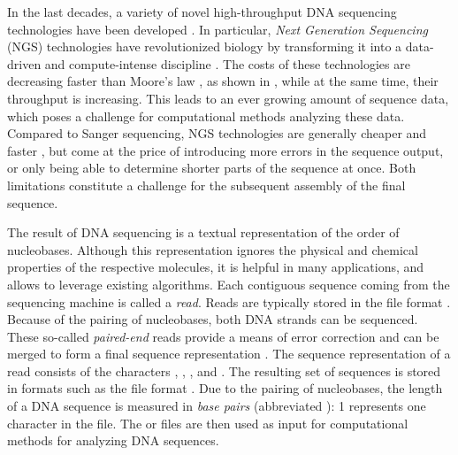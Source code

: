 In the last decades, a variety of novel high-throughput DNA sequencing technologies
have been developed \cite{Pettersson2009,Reuter2015,Goodwin2016}.
In particular, \emph{Next Generation Sequencing} (NGS) technologies \cite{Logares2012,Mardis2013}
have revolutionized biology by transforming it into a data-driven and compute-intense discipline \citep{Escobar-Zepeda2015}.
The costs of these technologies are decreasing faster than Moore's law \cite{Moore1965,Wetterstrand2018},
as shown in ,
while at the same time, their throughput is increasing.
This leads to an ever growing amount of sequence data,
which poses a challenge for computational methods analyzing these data.
Compared to Sanger sequencing, NGS technologies are generally cheaper and faster \cite{Voelkerding2009,Metzker2010},
but come at the price of introducing more errors in the sequence output,
or only being able to determine shorter parts of the sequence at once.
Both limitations constitute a challenge for the subsequent assembly of the final sequence.

The result of DNA sequencing is a textual representation of the order of nucleobases.
Although this representation ignores the physical and chemical properties of the respective molecules,
it is helpful in many applications, and allows to leverage existing algorithms.
Each contiguous sequence coming from the sequencing machine is called a \emph{read}.
Reads are typically stored in the  file format \citep{Cock2009}.
Because of the pairing of nucleobases, both DNA strands can be sequenced.
These so-called \emph{paired-end} reads provide a means of error correction
and can be merged to form a final sequence representation \cite{Zhang2014}.
The sequence representation of a read consists of
the characters , , , and .
The resulting set of sequences is stored in formats such as the  file format \citep{Pearson1988}.
Due to the pairing of nucleobases,
the length of a DNA sequence is measured in \emph{base pairs} (abbreviated \si{\basepair}):
\SI{1}{\basepair} represents one character in the file.
The  or  files are then used as input
for computational methods for analyzing DNA sequences.



